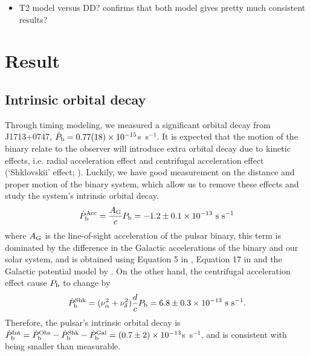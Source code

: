 \begin{itemize}
\item T2 model versus DD? confirms that both model gives pretty much consistent results?
\end{itemize}

\section{Result}

\subsection{Intrinsic orbital decay}
\label{sec:obdecay}
Through timing modeling, we measured a significant orbital decay from
J1713+0747, $\dot{P}_{\rm b} = 0.77(18)\times10^{-15}$s~s$^{-1}$. 
It is expected that the motion of the binary relate to the observer will introduce extra orbital decay due to kinetic effects, i.e. radial acceleration effect \citep{dt91} and centrifugal acceleration effect (`Shklovskii' effect; \citealt{shk70}). Luckily, we have good measurement on the distance and proper motion of the binary system, which allow us to remove these effects 
and study the system's intrinsic orbital decay.
\begin{equation}
\dot{P}_{\rm b}^{\rm Acc} = \frac{A_{\rm G}}{c} P_{\rm b} =
-1.2\pm0.1\times10^{-13}~{\rm s~s^{-1}}
\end{equation}
where $A_{\rm G}$ is the line-of-sight acceleration of the pulsar binary,
this term is dominated by the difference in the Galactic accelerations of the
binary and our solar system, and is obtained using
Equation 5 in \citet{nt95}, Equation 17 in \citet{lwj+09} and the Galactic
potential model by \citet{hf04a}.
On the other hand, the centrifugal acceleration effect cause $P_{\rm b}$ to
change by
\begin{equation}
\dot{P}_{\rm b}^{\rm Shk} = (\nu_{\alpha}^2+\nu_{\delta}^2)\frac{d}{c}P_{\rm
b} = 6.8\pm0.3\times10^{-13}~{\rm s~s^{-1}}.
\end{equation}
Therefore, the pulsar's intrinsic orbital decay is $\dot{P}_{\rm b}^{\rm Int}
= \dot{P}_{\rm b}^{\rm Obs} - \dot{P}_{\rm b}^{\rm Shk} - \dot{P}_{\rm b}^{\rm
Gal} = (0.7\pm2)\times10^{-13}$s~s$^{-1}$, and is consistent with being smaller than measurable.

